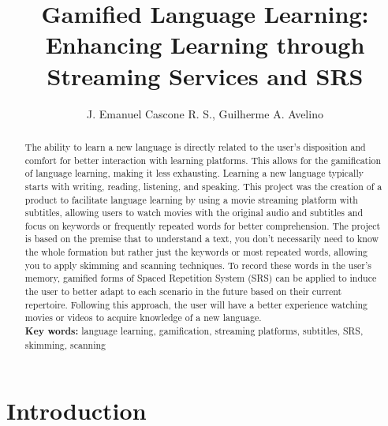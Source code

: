 \documentclass[12pt]{article}
\title{Gamified Language Learning: Enhancing Learning through Streaming Services and SRS}
\author{J. Emanuel Cascone R. S.\inst{1}, Guilherme A. Avelino\inst{1} }
\begin{document}
 

\maketitle

\begin{abstract} 
  The ability to learn a new language is directly related to the user's disposition and comfort for better interaction with learning platforms. This allows for the gamification of language learning, making it less exhausting. Learning a new language typically starts with writing, reading, listening, and speaking. This project was the creation of a product to facilitate language learning by using a movie streaming platform with subtitles, allowing users to watch movies with the original audio and subtitles and focus on keywords or frequently repeated words for better comprehension. The project is based on the premise that to understand a text, you don't necessarily need to know the whole formation but rather just the keywords or most repeated words, allowing you to apply skimming and scanning techniques. To record these words in the user's memory, gamified forms of Spaced Repetition System (SRS) can be applied to induce the user to better adapt to each scenario in the future based on their current repertoire. Following this approach, the user will have a better experience watching movies or videos to acquire knowledge of a new language. \\
  \textbf{Key words:} language learning, gamification, streaming platforms, subtitles, SRS, skimming, scanning
\end{abstract} 
\newpage


\section{Introduction} 
\end{document}
